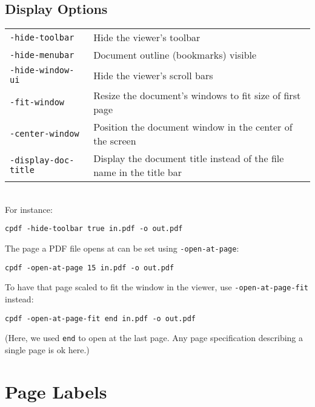 \documentclass{book}
\begin{document}
  \subsection{Display Options}
\vspace{2mm}
  {\small\begin{tabular}{ll}
    \texttt{-hide-toolbar} & \vspace{2mm} \parbox{8cm}{Hide the viewer's toolbar} \\
    \texttt{-hide-menubar} & \vspace{2mm} \parbox{8cm}{Document outline (bookmarks) visible} \\
    \texttt{-hide-window-ui} & \vspace{2mm} \parbox{8cm}{Hide the viewer's scroll bars} \\
    \texttt{-fit-window} & \vspace{2mm} \parbox{8cm}{Resize the document's windows to fit size of first page} \\
    \texttt{-center-window} & \vspace{2mm} \parbox{8cm}{Position the document window in the center of the screen} \\
    \texttt{-display-doc-title} & \vspace{2mm} \parbox{8cm}{Display the document title instead of the file name in the title bar}
  \end{tabular}}\\

  \noindent For instance:
  \begin{framed}
    \small\verb!cpdf -hide-toolbar true in.pdf -o out.pdf!
  \end{framed}

\noindent The page a PDF file opens at can be set using \texttt{-open-at-page}:
  \begin{framed}
    \small\verb!cpdf -open-at-page 15 in.pdf -o out.pdf!
  \end{framed}

\noindent To have that page scaled to fit the window in the viewer, use \texttt{-open-at-page-fit} instead:
  \begin{framed}
    \small\verb!cpdf -open-at-page-fit end in.pdf -o out.pdf!
  \end{framed}

\noindent (Here, we used \texttt{end} to open at the last page. Any page specification describing a single page is ok here.)

\section{Page Labels}
\end{document}
